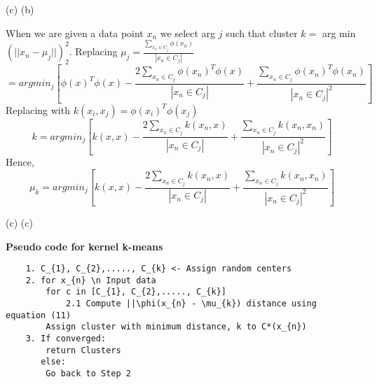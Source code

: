 \documentclass[12pt]{article}
\newenvironment{problem}[2][Problem]{\begin{trivlist}
\item[\hskip \labelsep {\bfseries #1}\hskip \labelsep {\bfseries #2.}]}{\end{trivlist}}
\begin{document}
\begin{problem} 1 (c) (b)
\end{problem}
\begin{Answer}
When we are given a data point $x_{n}$ we select arg $j$ such that cluster $k =$ arg min $(|| x_{n} - \mu_{j}||)_2^2$. Replacing $\mu_{j} =\frac{\sum_{x_{n} \in C_{j}} \phi(x_{n})}{| x_{n} \in C_{j}| } $
\begin{equation}
    = arg min_{j} [ \phi(x)^T\phi(x) - \frac{2\sum_{x_{n} \in C_{j}} \phi(x_{n})^T\phi(x)}{| x_{n} \in C_{j}|} + \frac{\sum_{x_{n} \in C_{j}} \phi(x_{n})^T\phi(x_{n})}{| x_{n} \in C_{j}|^2}]
\end{equation}
Replacing with $k(x_{i}, x_{j}) = \phi(x_{i})^T\phi(x_{j})$
\begin{equation}
    k = arg min_{j}[ k(x, x) - \frac{2\sum_{x_{n} \in C_{j}} k(x_{n}, x)}{| x_{n} \in C_{j}|} +  \frac{\sum_{x_{n} \in C_{j}} k(x_{n}, x_{n})}{| x_{n} \in C_{j}|^2}]
\end{equation}
Hence, 
\begin{equation}
    \mu_{k} = arg min_{j}[ k(x, x) - \frac{2\sum_{x_{n} \in C_{j}} k(x_{n}, x)}{| x_{n} \in C_{j}|} +  \frac{\sum_{x_{n} \in C_{j}} k(x_{n}, x_{n})}{| x_{n} \in C_{j}|^2}]
\end{equation}
\end{Answer}

\begin{problem} 1 (c) (c)
\end{problem}
\begin{Answer}
\textbf{Pseudo code for kernel k-means}
\begin{verbatim}
    1. C_{1}, C_{2},....., C_{k} <- Assign random centers
    2. for x_{n} \n Input data
        for c in [C_{1}, C_{2},....., C_{k}]
            2.1 Compute ||\phi(x_{n} - \mu_{k}) distance using equation (11)
        Assign cluster with minimum distance, k to C*(x_{n})
    3. If converged:
        return Clusters
       else:
        Go back to Step 2  
\end{verbatim}
\end{Answer}
\end{document}
